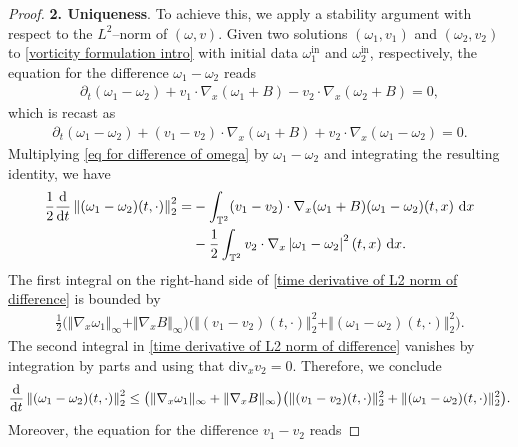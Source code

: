 \documentclass[11pt,reqno]{amsart}
\numberwithin{equation}{section}
\def\dd{{\rm d}}
\begin{document}
\begin{proof}
 \smallskip
\textbf{2. Uniqueness}. To achieve this, we apply a stability argument 
with respect to the $L^{2}$--norm of $(\omega,v)$. 
Given two solutions $(\omega_{1},v_{1})$ and $(\omega_{2},v_{2})$ 
to \eqref{vorticity formulation intro} 
with initial data $\omega_{1}^{\mathrm{in}}$ and $\omega_{2}^{\mathrm{in}}$, 
respectively,  the equation for the difference $\omega_{1}-\omega_{2}$ reads 
\begin{align*}
\partial_{t}(\omega_{1}-\omega_{2})+v_{1}\cdot \nabla_{x}(\omega_{1}+B)-v_{2}\cdot \nabla_{x}(\omega_{2}+B)=0,      
\end{align*}
which is recast as 
\begin{align}
\partial_{t}(\omega_{1}-\omega_{2})+(v_{1}-v_{2})\cdot \nabla_{x}(\omega_{1}+B)+v_{2}\cdot \nabla_{x}(\omega_{1}-\omega_{2})=0.\label{eq for difference of omega}    
\end{align}
Multiplying \eqref{eq for difference of omega} by $\omega_{1}-\omega_{2}$ and integrating the resulting identity, we have 
\begin{align}
\frac{1}{2}\frac{\dd}{\dd t}\left\Vert (\omega_{1}-\omega_{2})(t,\cdot)\right\Vert_{2}^{2}=&-\int_{\mathbb{T}^{2}}(v_{1}-v_{2})\cdot \nabla_{x}(\omega_{1}+B)(\omega_{1}-\omega_{2})(t,x)\ \dd x \notag\\
&-\frac{1}{2}\int_{\mathbb{T}^{2}}v_{2}\cdot \nabla_{x}\left\vert \omega_{1}-\omega_{2}\right\vert^{2}(t,x)\ \dd x. \label{time derivative of L2 norm of difference}  \end{align}
The first integral on the right-hand side of \eqref{time derivative of L2 norm of difference} is 
bounded by 
\begin{align*}
\frac{1}{2}\big(\Vert \nabla_{x}\omega_{1}\Vert_{\infty}
+\Vert \nabla_{x}B\Vert_{\infty}\big)
\big(\Vert (v_{1}-v_{2})(t,\cdot)\Vert_{2}^{2}+\Vert (\omega_{1}-\omega_{2})(t,\cdot)\Vert_{2}^{2}\big).    
\end{align*}
The second integral in \eqref{time derivative of L2 norm of difference} vanishes by integration by parts and using that $\mathrm{div}_{x}v_{2}=0$. Therefore, we conclude 
\begin{align}
\frac{\dd}{\dd t}\left\Vert (\omega_{1}-\omega_{2})(t,\cdot)\right\Vert_{2}^{2}
\leq \big(\Vert \nabla_{x}\omega_{1}\Vert_{\infty}
  +\Vert \nabla_{x}B\Vert_{\infty}\big)
  \big(\Vert (v_{1}-v_{2})(t,\cdot)\Vert_{2}^{2}+\Vert (\omega_{1}-\omega_{2})(t,\cdot)\Vert_{2}^{2}\big). \label{time der of L2 norm of difference} 
\end{align}
Moreover,  the  equation for the difference  $v_{1}-v_{2}$ reads  

\end{proof}
\end{document}
